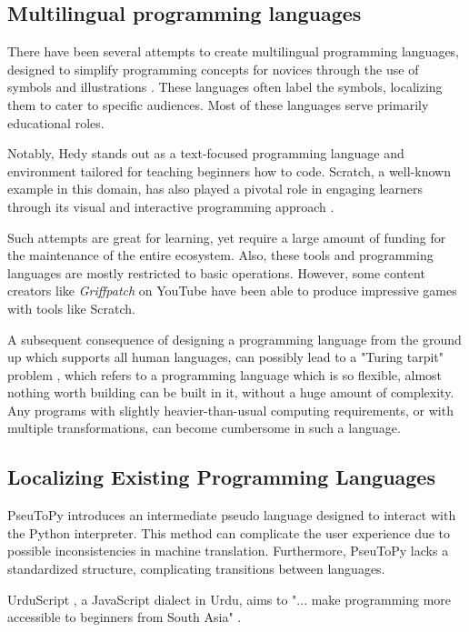 \documentclass[conference]{IEEEtran}
\begin{document}
\subsection{Multilingual programming languages}

There have been several attempts to create multilingual programming languages, designed to simplify programming concepts for novices through the use of symbols and illustrations \cite{suleiman1995visual}. These languages often label the symbols, localizing them to cater to specific audiences. Most of these languages serve primarily educational roles.

Notably, Hedy \cite{Hermans_Hedy_A_Gradual} stands out as a text-focused programming language and environment tailored for teaching beginners how to code. Scratch, a well-known example in this domain, has also played a pivotal role in engaging learners through its visual and interactive programming approach \cite{resnick2009scratch}.

Such attempts are great for learning, yet require a large amount of funding for the maintenance of the entire ecosystem. Also, these tools and programming languages are mostly restricted to basic operations. However, some content creators like \textit{Griffpatch} on YouTube \cite{freitasfilho2022scratch} have been able to produce impressive games with tools like Scratch.

A subsequent consequence of designing a programming language from the ground up which supports all human languages, can possibly lead to a "Turing tarpit" problem \cite{perlis1982special}, which refers to a programming language which is so flexible, almost nothing worth building can be built in it, without a huge amount of complexity. Any programs with slightly heavier-than-usual computing requirements, or with multiple transformations, can become cumbersome in such a language.

\subsection{Localizing Existing Programming Languages}

PseuToPy \cite{wang2021pseutopy} introduces an intermediate pseudo language designed to interact with the Python interpreter. This method can complicate the user experience due to possible inconsistencies in machine translation. Furthermore, PseuToPy lacks a standardized structure, complicating transitions between languages.

UrduScript \cite{Memon_UrduScript_2019}, a JavaScript dialect in Urdu, aims to "... make programming more accessible to beginners from South Asia" \cite{Urdu_Mein_Programming}.
\end{document}
